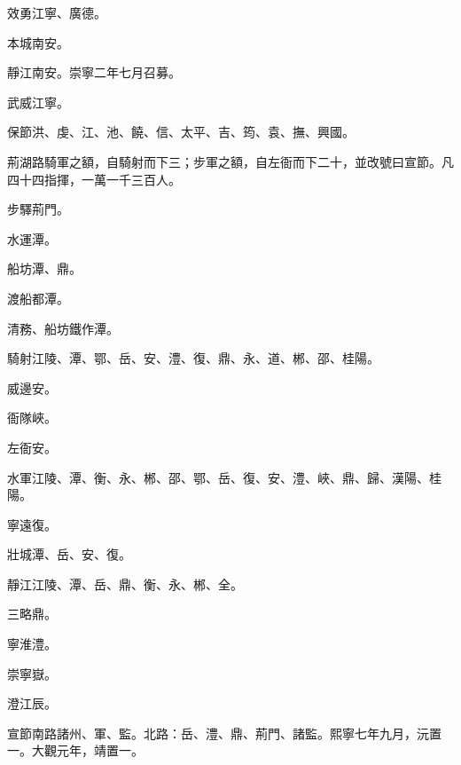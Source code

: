 \begin{pinyinscope}
 效勇江寧、廣德。



 本城南安。



 靜江南安。崇寧二年七月召募。



 武威江寧。



 保節洪、虔、江、池、饒、信、太平、吉、筠、袁、撫、興國。



 荊湖路騎軍之額，自騎射而下三；步軍之額，自左衙而下二十，並改號曰宣節。凡四十四指揮，一萬一千三百人。



 步驛荊門。



 水運潭。



 船坊潭、鼎。



 渡船都潭。



 清務、船坊鐵作潭。



 騎射江陵、潭、鄂、岳、安、澧、復、鼎、永、道、郴、邵、桂陽。



 威邊安。



 衙隊峽。



 左衙安。



 水軍江陵、潭、衡、永、郴、邵、鄂、岳、復、安、澧、峽、鼎、歸、漢陽、桂陽。



 寧遠復。



 壯城潭、岳、安、復。



 靜江江陵、潭、岳、鼎、衡、永、郴、全。



 三略鼎。



 寧淮澧。



 崇寧嶽。



 澄江辰。



 宣節南路諸州、軍、監。北路：岳、澧、鼎、荊門、諸監。熙寧七年九月，沅置一。大觀元年，靖置一。




\end{pinyinscope}
